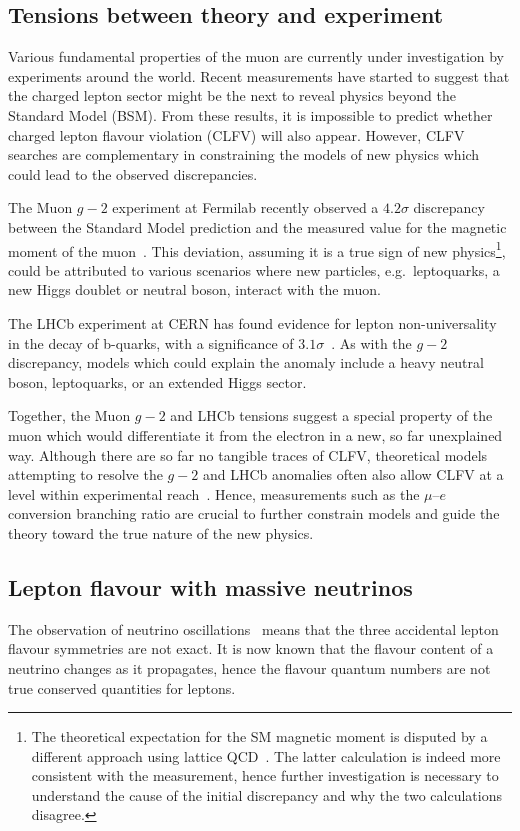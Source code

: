 \subsection{Tensions between theory and experiment}
Various fundamental properties of the muon are currently under investigation by
experiments around the world. Recent measurements have started to suggest that
the charged lepton sector might be the next to reveal physics beyond the
Standard Model (BSM). From these results, it is impossible to predict whether
charged lepton flavour violation (CLFV) will also appear. However, CLFV searches
are complementary in constraining the models of new physics which could lead to
the observed discrepancies.

The Muon $g-2$ experiment at Fermilab recently observed a $4.2\sigma$
discrepancy between the Standard Model prediction and the measured value for the
magnetic moment of the muon~\cite{PhysRevLett.126.141801}. This deviation,
assuming it is a true sign of new physics\footnote{
    The theoretical expectation for the SM magnetic moment is disputed by a
    different approach using lattice QCD~\cite{Borsanyi2021}. The latter calculation
    is indeed more consistent with the measurement, hence further investigation is
    necessary to understand the cause of the initial discrepancy and why the two
    calculations disagree.
}, could be attributed to various scenarios where new particles, e.g.\ 
leptoquarks, a new Higgs doublet or neutral boson, interact with the muon.


The LHCb experiment at CERN has found evidence for lepton non-universality in
the decay of b-quarks, with a significance of $3.1\sigma$~\cite{Aaij2022}. As
with the $g-2$ discrepancy, models which could explain the anomaly include a
heavy neutral boson, leptoquarks, or an extended Higgs sector. 

Together, the Muon $g-2$ and LHCb tensions suggest a special property of the
muon which would differentiate it from the electron in a new, so far unexplained
way. Although there are so far no tangible traces of CLFV, theoretical models
attempting to resolve the $g-2$ and LHCb anomalies often also allow CLFV at a
level within experimental reach~\cite{DEGOUVEA201375, PhysRevD.101.115016,
PhysRevD.100.115010}. Hence, measurements such as the $\mu$--$e$ conversion
branching ratio are crucial to further constrain models and guide the theory
toward the true nature of the new physics.


\subsection{Lepton flavour with massive neutrinos}
The observation of neutrino oscillations~\cite{PhysRevLett.81.1562} means that
the three accidental lepton flavour symmetries are not exact. It is now known
that the flavour content of a neutrino changes as it propagates, hence the
flavour quantum numbers are not true conserved quantities for leptons. 


